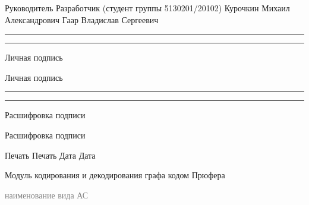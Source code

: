 \documentclass[12pt,a4paper]{article}
\begin{document}
\begin{flushleft}
Руководитель \hspace{6.2cm} Разработчик (студент группы\newline
\phantom{Руководитель} \hspace{6.2cm} 5130201/20102) \vspace{0.2cm}\newline 
Курочкин Михаил Александрович \hspace{2.26cm} Гаар Владислав Сергеевич \vspace{0.2cm}\newline
\rule[0pt]{4cm}{0.5pt} \hspace{4.8cm} \rule[0pt]{4cm}{0.5pt} \vspace{-0.1cm} \newline
\begin{small}Личная подпись\end{small} \hspace{5.9cm} \begin{small}Личная подпись\end{small} \vspace{0.2cm}\newline
\rule[0pt]{4cm}{0.5pt} \hspace{4.8cm} \rule[0pt]{4cm}{0.5pt} \vspace{-0.1cm} \newline
\begin{small}Расшифровка подписи\end{small} \hspace{4.8cm} \begin{small}Расшифровка подписи\end{small} \vspace{0.2cm}\newline
Печать \hspace{7.43cm} Печать \vspace{0.1cm}\newline
Дата \hspace{7.85cm} Дата 
\end{flushleft}
\vspace{0.2cm}
\begin{center}
\large{Модуль кодирования и декодирования графа кодом Прюфера}
\end{center}
\vspace{-0.6cm}
\hrulefill
\begin{center}
\vspace{-0.4cm}
   \textcolor{gray}{\footnotesize{наименование вида АС}}
\end{center}
\end{document}
